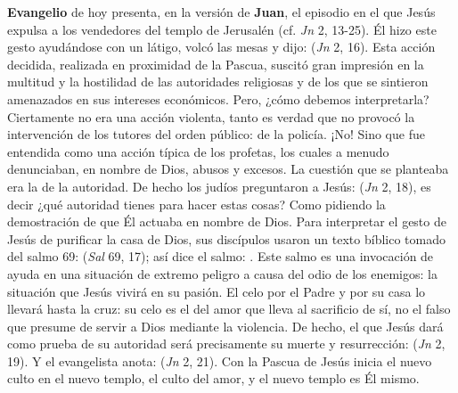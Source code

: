 \begin{body}
 \textbf{Evangelio} de hoy presenta, en la versión de \textbf{Juan}, el episodio en el que Jesús expulsa a los vendedores del templo de Jerusalén (cf. \textit{Jn} 2, 13-25). Él hizo este gesto ayudándose con un látigo, volcó las mesas y dijo:  (\textit{Jn} 2, 16). Esta acción decidida, realizada en proximidad de la Pascua, suscitó gran impresión en la multitud y la hostilidad de las autoridades religiosas y de los que se sintieron amenazados en sus intereses económicos. Pero, ¿cómo debemos interpretarla? Ciertamente no era una acción violenta, tanto es verdad que no provocó la intervención de los tutores del orden público: de la policía. ¡No! Sino que fue entendida como una acción típica de los profetas, los cuales a menudo denunciaban, en nombre de Dios, abusos y excesos. La cuestión que se planteaba era la de la autoridad. De hecho los judíos preguntaron a Jesús:  (\textit{Jn} 2, 18), es decir ¿qué autoridad tienes para hacer estas cosas? Como pidiendo la demostración de que Él actuaba en nombre de Dios. Para interpretar el gesto de Jesús de purificar la casa de Dios, sus discípulos usaron un texto bíblico tomado del salmo 69:  (\textit{Sal} 69, 17); así dice el salmo: . Este salmo es una invocación de ayuda en una situación de extremo peligro a causa del odio de los enemigos: la situación que Jesús vivirá en su pasión. El celo por el Padre y por su casa lo llevará hasta la cruz: su celo es el del amor que lleva al sacrificio de sí, no el falso que presume de servir a Dios mediante la violencia. De hecho, el  que Jesús dará como prueba de su autoridad será precisamente su muerte y resurrección:  (\textit{Jn} 2, 19). Y el evangelista anota:  (\textit{Jn} 2, 21). Con la Pascua de Jesús inicia el nuevo culto en el nuevo templo, el culto del amor, y el nuevo templo es Él mismo.


\end{body}
